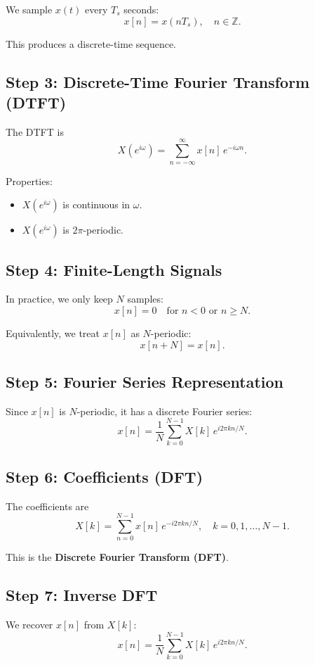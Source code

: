 \documentclass[a4paper,12pt]{article}
\begin{document}
We sample $x(t)$ every $T_s$ seconds:
\[
x[n] = x(nT_s), \quad n \in \mathbb{Z}.
\]

This produces a discrete-time sequence.

\subsection{Step 3: Discrete-Time Fourier Transform (DTFT)}

The DTFT is
\[
X(e^{i\omega}) = \sum_{n=-\infty}^{\infty} x[n]\, e^{-i \omega n}.
\]

Properties:
\begin{itemize}
    \item $X(e^{i\omega})$ is continuous in $\omega$.
    \item $X(e^{i\omega})$ is $2\pi$-periodic.
\end{itemize}

\subsection{Step 4: Finite-Length Signals}

In practice, we only keep $N$ samples:
\[
x[n] = 0 \quad \text{for } n < 0 \text{ or } n \geq N.
\]

Equivalently, we treat $x[n]$ as $N$-periodic:
\[
x[n+N] = x[n].
\]

\subsection{Step 5: Fourier Series Representation}

Since $x[n]$ is $N$-periodic, it has a discrete Fourier series:
\[
x[n] = \frac{1}{N} \sum_{k=0}^{N-1} X[k]\, e^{i 2\pi kn / N}.
\]

\subsection{Step 6: Coefficients (DFT)}

The coefficients are
\[
X[k] = \sum_{n=0}^{N-1} x[n]\, e^{-i 2\pi kn / N}, \quad k = 0,1,\dots,N-1.
\]

This is the \textbf{Discrete Fourier Transform (DFT)}.

\subsection{Step 7: Inverse DFT}

We recover $x[n]$ from $X[k]$:
\[
x[n] = \frac{1}{N} \sum_{k=0}^{N-1} X[k]\, e^{i 2\pi kn / N}.
\]
\end{document}
